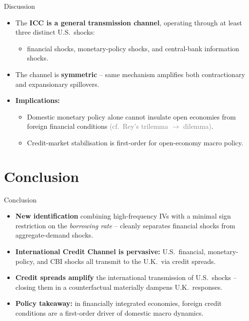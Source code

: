 \documentclass[10pt]{beamer}
\begin{document}
\begin{frame}{Discussion}
\begin{itemize}
    \item The \textbf{ICC is a general transmission channel}, operating through at least three distinct U.S.\ shocks:
    \begin{itemize}\small
        \item financial shocks, monetary-policy shocks, and central-bank information shocks.
    \end{itemize}
    \vspace{0.4em}
    \item The channel is \textbf{symmetric} -- same mechanism amplifies both contractionary and expansionary spillovers.
    \vspace{0.4em}
    \item \textbf{Implications:}
    \begin{itemize}\small
        \item Domestic monetary policy alone cannot insulate open economies from foreign financial conditions \textcolor{gray}{\scriptsize(cf.\ Rey's trilemma $\to$ dilemma)}.
        \item Credit-market stabilisation is first-order for open-economy macro policy.
    \end{itemize}
\end{itemize}
\end{frame}


\section{Conclusion}

\begin{frame}{Conclusion}
\begin{itemize}
    \item \textbf{New identification} combining high-frequency IVs with a minimal sign restriction on the \emph{borrowing rate} -- cleanly separates financial shocks from aggregate-demand shocks.
    \vspace{0.4em}
    \item \textbf{International Credit Channel is pervasive:} U.S.\ financial, monetary-policy, and CBI shocks all transmit to the U.K.\ via credit spreads.
    \vspace{0.4em}
    \item \textbf{Credit spreads amplify} the international transmission of U.S.\ shocks -- closing them in a counterfactual materially dampens U.K.\ responses.
    \vspace{0.4em}
    \item \textbf{Policy takeaway:} in financially integrated economies, foreign credit conditions are a first-order driver of domestic macro dynamics.
\end{itemize}
\end{frame}
\end{document}
